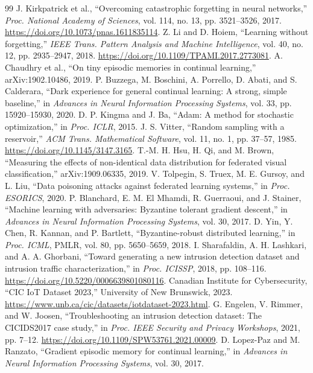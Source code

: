 \documentclass[10pt,a4paper]{article}
\begin{document}
\begin{thebibliography}{99}
 J. Kirkpatrick et al., \enquote{Overcoming catastrophic forgetting in neural networks,} \emph{Proc. National Academy of Sciences}, vol. 114, no. 13, pp. 3521--3526, 2017. \url{https://doi.org/10.1073/pnas.1611835114}.
 Z. Li and D. Hoiem, \enquote{Learning without forgetting,} \emph{IEEE Trans. Pattern Analysis and Machine Intelligence}, vol. 40, no. 12, pp. 2935--2947, 2018. \url{https://doi.org/10.1109/TPAMI.2017.2773081}.
 A. Chaudhry et al., \enquote{On tiny episodic memories in continual learning,} arXiv:1902.10486, 2019.
 P. Buzzega, M. Boschini, A. Porrello, D. Abati, and S. Calderara, \enquote{Dark experience for general continual learning: A strong, simple baseline,} in \emph{Advances in Neural Information Processing Systems}, vol. 33, pp. 15920--15930, 2020.
 D. P. Kingma and J. Ba, \enquote{Adam: A method for stochastic optimization,} in \emph{Proc. ICLR}, 2015.
 J. S. Vitter, \enquote{Random sampling with a reservoir,} \emph{ACM Trans. Mathematical Software}, vol. 11, no. 1, pp. 37--57, 1985. \url{https://doi.org/10.1145/3147.3165}.
 T.-M. H. Hsu, H. Qi, and M. Brown, \enquote{Measuring the effects of non-identical data distribution for federated visual classification,} arXiv:1909.06335, 2019.
 V. Tolpegin, S. Truex, M. E. Gursoy, and L. Liu, \enquote{Data poisoning attacks against federated learning systems,} in \emph{Proc. ESORICS}, 2020.
 P. Blanchard, E. M. El Mhamdi, R. Guerraoui, and J. Stainer, \enquote{Machine learning with adversaries: Byzantine tolerant gradient descent,} in \emph{Advances in Neural Information Processing Systems}, vol. 30, 2017.
 D. Yin, Y. Chen, R. Kannan, and P. Bartlett, \enquote{Byzantine-robust distributed learning,} in \emph{Proc. ICML}, PMLR, vol. 80, pp. 5650--5659, 2018.
 I. Sharafaldin, A. H. Lashkari, and A. A. Ghorbani, \enquote{Toward generating a new intrusion detection dataset and intrusion traffic characterization,} in \emph{Proc. ICISSP}, 2018, pp. 108--116. \url{https://doi.org/10.5220/0006639801080116}.
 Canadian Institute for Cybersecurity, \enquote{CIC IoT Dataset 2023,} University of New Brunswick, 2023. \url{https://www.unb.ca/cic/datasets/iotdataset-2023.html}.
 G. Engelen, V. Rimmer, and W. Joosen, \enquote{Troubleshooting an intrusion detection dataset: The CICIDS2017 case study,} in \emph{Proc. IEEE Security and Privacy Workshops}, 2021, pp. 7--12. \url{https://doi.org/10.1109/SPW53761.2021.00009}.
 D. Lopez-Paz and M. Ranzato, \enquote{Gradient episodic memory for continual learning,} in \emph{Advances in Neural Information Processing Systems}, vol. 30, 2017.

\end{thebibliography}
\end{document}
